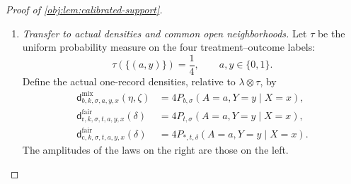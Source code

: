 \documentclass[11pt]{article}
\begin{document}
\begin{proof}[Proof of \cref{obj:lem:calibrated-support}]
\begin{enumerate}
For the fair cells, the selected root belongs to \((3/10,1/2)\); this includes its default value \(2/5\). Since
\[
|\delta Z_u(\mathbf s)|\le\frac1{50},
\]
both fair control risks belong to \([1/4,3/5]\).
For \(t\in[0,1/4]\), the elementary exponential estimate gives
\[
0\le e^t-1\le\frac43t\le\frac13.
\]
The comparator effect lies between \(t/2\) and \(t\), by
\cref{obj:lem:exact-calibrations}. Thus the effect used in either fair branch lies in \([0,1/4]\). For
\(\vartheta\in[0,1/4]\) and \(\xi\in[1/4,3/5]\),
\[
\mathsf G(\vartheta,\xi)
=\frac{e^\vartheta\xi}{1+(e^\vartheta-1)\xi},
\qquad
\frac14\le\mathsf G(\vartheta,\xi)\le\frac34.
\]
To check the last bounds, the denominator is positive; multiplication by it reduces the lower bound to
\[
(1+e^\vartheta-1)\xi
\ge\frac14\{1+(e^\vartheta-1)\xi\},
\]
using \(\xi\ge1/4\), and the upper bound follows from
\(\xi\le3/5\) and \(e^\vartheta-1\le1/3\).
Consequently both fair arm risks and their complements are at least \(1/4\), and
\[
\frac12\le4\pi^{\mathrm{fair}}_{\iota,\mathbf s,ay}\le2.
\]

Finally, direct addition of either four-cell formula gives
\[
\sum_{a,y}\pi^{\mathrm{mix}}_{b,\mathbf s,ay}=1,
\qquad
\sum_{a,y}\pi^{\mathrm{fair}}_{\iota,\mathbf s,ay}=1.
\]
Every cell lies in \([1/8,1/2]\), so the cells are strictly interior. Together with continuity, this proves validity throughout both doubled closed boxes. The constructed laws therefore retain their supplied cells there.

\item \textit{Transfer to actual densities and common open neighborhoods.}
Let \(\tau\) be the uniform probability measure on the four treatment--outcome labels:
\[
\tau(\{(a,y)\})=\frac14,\qquad a,y\in\{0,1\}.
\]
Define the actual one-record densities, relative to \(\lambda\otimes\tau\), by
\[
\begin{aligned}
\mathsf d^{\mathrm{mix}}_{b,k,\sigma,a,y,x}(\eta,\zeta)
&=4P_{b,\sigma}(A=a,Y=y\mid X=x),\\
\mathsf d^{\mathrm{fair}}_{\mathrm r,k,\sigma,t,a,y,x}(\delta)
&=4P_{t,\sigma}(A=a,Y=y\mid X=x),\\
\mathsf d^{\mathrm{fair}}_{\mathrm c,k,\sigma,t,a,y,x}(\delta)
&=4P_{*,t,\delta}(A=a,Y=y\mid X=x).
\end{aligned}
\]
The amplitudes of the laws on the right are those on the left.


\end{enumerate}
\end{proof}
\end{document}
